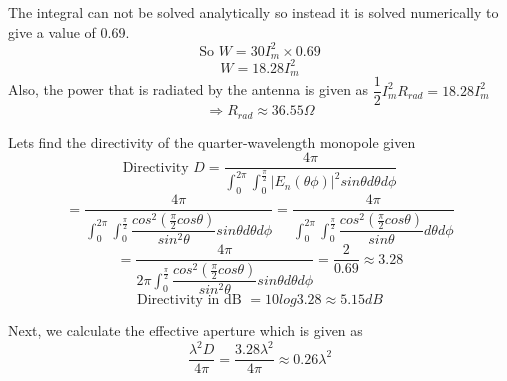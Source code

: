 The integral can not be solved analytically so instead it is solved numerically to give a value of 0.69.
\[ \text{So } W = 30I_m^2 \times 0.69 \]
\begin{equation}
W = 18.28I_m^2
\end{equation}
Also, the power that is radiated by the antenna is given as $\dfrac{1}{2}I_m^2 R_{rad} = 18.28I_m^2$
\[ \Rightarrow R_{rad} \approx 36.55\Omega \]

Lets find the directivity of the quarter-wavelength monopole given 
\[ \text{Directivity }D = \dfrac{4\pi}{\int_{0}^{2\pi}\int_{0}^{\frac{\pi}{2}}|E_n(\theta\phi)|^2sin\theta d\theta d\phi} \]
\[ = \dfrac{4\pi}{\int_{0}^{2\pi}\int_{0}^{\frac{\pi}{2}}\dfrac{cos^2(\frac{\pi}{2}cos\theta)}{sin^2\theta}sin\theta d\theta d\phi} = \dfrac{4\pi}{\int_{0}^{2\pi}\int_{0}^{\frac{\pi}{2}}\dfrac{cos^2(\frac{\pi}{2}cos\theta)}{sin\theta} d\theta d\phi} \]
\[ = \dfrac{4\pi}{2\pi\int_{0}^{\frac{\pi}{2}}\dfrac{cos^2(\frac{\pi}{2}cos\theta)}{sin^2\theta}sin\theta d\theta d\phi} = \dfrac{2}{0.69} \approx 3.28 \]
\[ \text{Directivity in dB } = 10log3.28 \approx 5.15dB \]

Next, we calculate the effective aperture which is given as 
\[ \dfrac{\lambda^2 D}{4\pi} = \dfrac{3.28\lambda^2}{4\pi} \approx 0.26\lambda^2 \]


